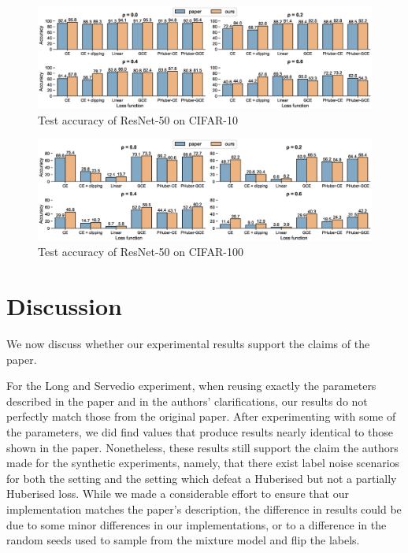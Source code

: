 \begin{figure}[htbp]
  \centering
  \includegraphics[width=\columnwidth]{figs/cifar10.eps}
  \caption{Test accuracy of ResNet-50 on CIFAR-10}
  \label{fig:cifar10-comparison}
\end{figure}
\vspace{-2mm}

\begin{figure}[!h]
  \centering
  \includegraphics[width=\columnwidth]{figs/cifar100.eps}
  \caption{Test accuracy of ResNet-50 on CIFAR-100}
  \label{fig:cifar100-comparison}
\end{figure}

\section{Discussion}
\label{sec:discussion}

We now discuss whether our experimental results support the claims of the paper. 

For the Long and Servedio experiment, when reusing exactly the parameters described in the paper and in the authors' clarifications, our results do not perfectly match those from the original paper. After experimenting with some of the parameters, we did find values that produce results nearly identical to those shown in the paper. Nonetheless, these results still support the claim the authors made for the synthetic experiments, namely, that there exist label noise scenarios for both the \citet{long_random_2010} setting and the \citet{ding_statistical_2013} setting which defeat a Huberised but not a partially Huberised loss. While we made a considerable effort to ensure that our implementation matches the paper's description, the difference in results could be due to some minor differences in our implementations, or to a difference in the random seeds used to sample from the mixture model and flip the labels.

